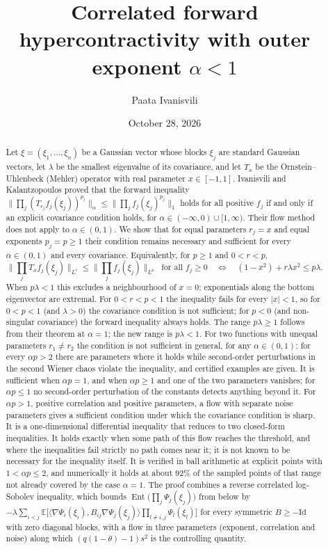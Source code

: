 \documentclass[11pt]{amsart}
\title[Correlated forward hypercontractivity for \texorpdfstring{$\alpha<1$}{alpha<1}]{Correlated forward
hypercontractivity with outer exponent \texorpdfstring{$\alpha<1$}{alpha<1}}
\author{Paata Ivanisvili}
\date{October 28, 2026}
\theoremstyle{definition}
\newcommand{\E}{\mathbb{E}}
\newcommand{\Ent}{\operatorname{Ent}}
\newcommand{\Id}{\mathrm{Id}}
\begin{document}
\sloppy
\begin{abstract}
Let $\xi=(\xi_1,\dots,\xi_n)$ be a Gaussian vector whose blocks $\xi_j$ are standard Gaussian vectors, let
$\lambda$ be the smallest eigenvalue of its covariance, and let $T_x$ be the Ornstein--Uhlenbeck (Mehler) operator
with real parameter $x\in[-1,1]$. Ivanisvili and Kalantzopoulos proved that the forward inequality
$\|\prod_j(T_{r_j}f_j(\xi_j))^{p_j}\|_{\alpha}\le\|\prod_jf_j(\xi_j)^{p_j}\|_1$ holds for all positive $f_j$ if and
only if an explicit covariance condition holds, for $\alpha\in(-\infty,0)\cup[1,\infty)$. Their flow method does not
apply to $\alpha\in(0,1)$. We show that for equal parameters $r_j=x$ and equal exponents $p_j=p\ge1$ their condition
remains necessary and sufficient for every $\alpha\in(0,1)$ and every covariance. Equivalently, for $p\ge1$ and
$0<r<p$,
\[
\Big\|\prod_jT_xf_j(\xi_j)\Big\|_{L^r}\le\Big\|\prod_jf_j(\xi_j)\Big\|_{L^p}\ \text{ for all }f_j\ge0
\quad\Longleftrightarrow\quad(1-x^2)+r\lambda x^2\le p\lambda .
\]
When $p\lambda<1$ this excludes a neighbourhood of $x=0$; exponentials along the bottom eigenvector are extremal. For
$0<r<p<1$ the inequality fails for every $|x|<1$, so for $0<p<1$ (and $\lambda>0$) the covariance condition is not
sufficient; for $p<0$ (and non-singular covariance) the forward inequality always holds. The range $p\lambda\ge1$ follows from their theorem at
$\alpha=1$; the new range is $p\lambda<1$. For two functions with unequal parameters $r_1\ne r_2$ the condition is not
sufficient in general, for any $\alpha\in(0,1)$: for every $\alpha p>2$ there are parameters where it holds while
second-order perturbations in the second Wiener chaos violate the inequality, and certified examples are given. It is
sufficient when $\alpha p=1$, and when $\alpha p\ge1$ and one of the two parameters vanishes; for $\alpha p\le1$ no
second-order perturbation of the constants detects anything beyond it. For $\alpha p>1$, positive correlation and positive parameters, a flow with
separate noise parameters gives a sufficient condition under which the covariance condition is sharp. It is a one-dimensional
differential inequality that reduces to two closed-form inequalities. It holds exactly when some path of this flow
reaches the threshold, and where the inequalities fail strictly no path comes near it; it is not known to be
necessary for the inequality itself. It is verified in ball arithmetic at explicit points with $1<\alpha p\le2$, and
numerically it holds at about $92\%$ of the sampled points of that range not already covered by the case $\alpha=1$. The
proof combines a reverse correlated log-Sobolev inequality, which bounds
$\Ent\big(\prod_j\Psi_j(\xi_j)\big)$ from below by $-\lambda\sum_{i<j}\E\big[\langle\nabla\Psi_i(\xi_i),
B_{ij}\nabla\Psi_j(\xi_j)\rangle\prod_{l\ne i,j}\Psi_l(\xi_l)\big]$ for every symmetric $B\ge-\Id$ with zero diagonal
blocks, with a flow in three parameters (exponent, correlation and noise) along which $(q(1-\theta)-1)s^2$ is the
controlling quantity.
\end{abstract}
\end{document}

